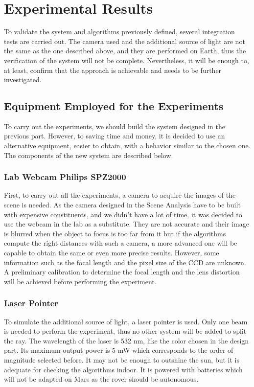 \chapter{Experimental Results}

To validate the system and algorithms previously defined, several integration tests are carried out. The camera used and the additional source of light are not the same as the one described above, and they are performed on Earth, thus the verification of the system will not be complete. Nevertheless, it will be enough to, at least, confirm that the approach is achievable and needs to be further investigated. 

\section{Equipment Employed for the Experiments}
To carry out the experiments, we should build the system designed in the previous part. However, to saving time and money, it is decided to use an alternative equipment, easier to obtain, with a behavior similar to the chosen one. The components of the new system are described below.

\subsection{Lab Webcam Philips SPZ2000}
First, to carry out all the experiments, a camera to acquire the images of the scene is needed. As the camera designed in the Scene Analysis have to be built with expensive constituents, and we didn't have a lot of time, it was decided to use the webcam in the lab as a substitute. They are not accurate and their image is blurred when the object to focus is too far from it but if the algorithms compute the right distances with such a camera, a more advanced one will be capable to obtain the same or even more precise results. However, some information such as the focal length and the pixel size of the CCD are unknown. A preliminary calibration to determine the focal length and the lens distortion will be achieved before performing the experiment.

\subsection{Laser Pointer}
To simulate the additional source of light, a laser pointer is used. Only one beam is needed to perform the experiment, thus no other system will be added to split the ray. The wavelength of the laser is 532 nm, like the color chosen in the design part. Its maximum output power is 5 mW which corresponds to the order of magnitude selected before. It may not be enough to outshine the sun, but it is adequate for checking the algorithms indoor. It is powered with batteries which will not be adapted on Mars as the rover should be autonomous. 

